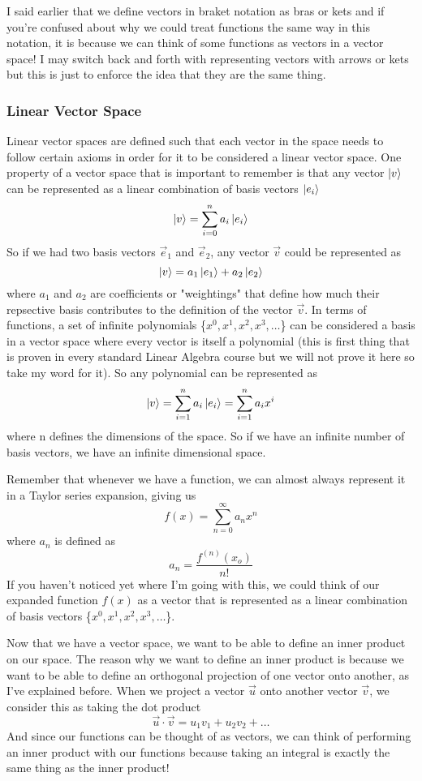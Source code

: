\documentclass{article}
\newcommand{\be}{\begin{equation}}
\newcommand{\ee}{\end{equation}}
\begin{document}
I said earlier that we define vectors in braket notation as bras or kets and if you're confused about why we could treat functions the same way in this notation, it is because we can think of some functions as vectors in a vector space!
I may switch back and forth with representing vectors with arrows or kets but this is just to enforce the idea that they are the same thing.

\subsubsection*{Linear Vector Space}
Linear vector spaces are defined such that each vector in the space needs to follow certain axioms in order for it to be considered a linear vector space.
One property of a vector space that is important to remember is that any vector $\ket{v}$ can be represented as a linear combination of basis vectors $\ket{e_i}$
\be
  \ket{v} = \sum_{i = 0}^{n} a_i \ket{e_i}
\ee
So if we had two basis vectors $\vec{e}_1$ and $\vec{e}_2$, any vector $\vec{v}$ could be represented as
\be
  \ket{v} = a_1 \ket{e_1} + a_2 \ket{e_2}
\ee
where $a_1$ and $a_2$ are coefficients or "weightings" that define how much their repsective basis contributes to the definition of the vector $\vec{v}$.
In terms of functions, a set of infinite polynomials \{$x^0, x^1, x^2, x^3, \hdots$\} can be considered a basis in a vector space where every vector is itself a polynomial (this is first thing that is proven in every standard Linear Algebra course but we will not prove it here so take my word for it).
So any polynomial can be represented as
\be
  \ket{v} = \sum_{i=1}^{n} a_i \ket{e_i} = \sum_{i=1}^{n} a_i x^i
\ee
where n defines the dimensions of the space.
So if we have an infinite number of basis vectors, we have an infinite dimensional space.

Remember that whenever we have a function, we can almost always represent it in a Taylor series expansion, giving us
\be
  f(x) = \sum_{n=0}^{\infty} a_n x^n
\ee
where $a_n$ is defined as
\be
  a_n = \frac{f^{(n)}(x_o)}{n!}
\ee
If you haven't noticed yet where I'm going with this, we could think of our expanded function $f(x)$ as a vector that is represented as a linear combination of basis vectors \{$x^0, x^1, x^2, x^3, \hdots$\}.

Now that we have a vector space, we want to be able to define an inner product on our space.
The reason why we want to define an inner product is because we want to be able to define an orthogonal projection of one vector onto another, as I've explained before.
When we project a vector $\vec{u}$ onto another vector $\vec{v}$, we consider this as taking the dot product
\be
  \vec{u} \cdot \vec{v} = u_1v_1 + u_2v_2 + \hdots
\ee
And since our functions can be thought of as vectors, we can think of performing an inner product with our functions because taking an integral is exactly the same thing as the inner product!
\end{document}
